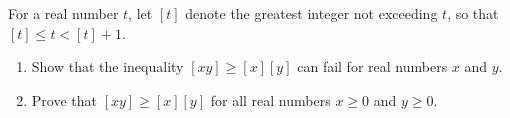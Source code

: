 For a real number $t$, let $[t]$ denote the greatest integer not exceeding $t$, so that $[t]\le t<[t]+1$.
\begin{enumerate}
\item[(a)] Show that the inequality $[xy]\ge[x][y]$ can fail for real numbers $x$ and $y$.
\item[(b)] Prove that $[xy]\ge[x][y]$ for all real numbers $x\ge0$ and $y\ge0$.
\end{enumerate}
